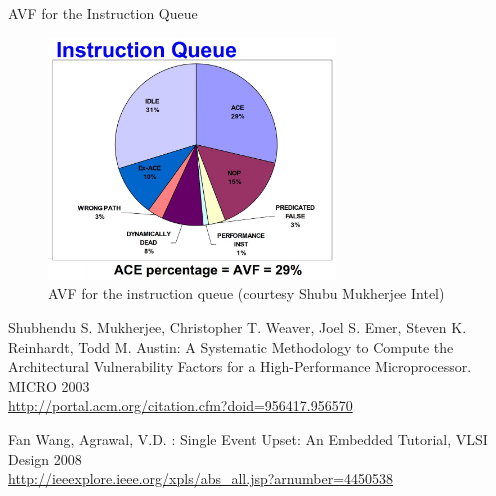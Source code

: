 \documentclass{beamer}
\begin{document}
\begin{frame}[shrink=10]{AVF for the Instruction Queue}
\begin{center}
\begin{figure}[h]
 \includegraphics[width=3in]{inst_queue}
\caption{\footnotesize AVF for the instruction queue (courtesy Shubu Mukherjee Intel)}
\end{figure}
\end{center}
\end{frame}


\footnotesize
\begin{thebibliography}{10}
Shubhendu S. Mukherjee, 
Christopher T. Weaver, Joel S. Emer, Steven K. Reinhardt, Todd M. Austin: A Systematic 
Methodology to Compute the Architectural Vulnerability Factors for a High-Performance Microprocessor. MICRO 2003 \\
\url{http://portal.acm.org/citation.cfm?doid=956417.956570}

Fan Wang, Agrawal, V.D. : Single Event Upset: An Embedded Tutorial, VLSI Design 2008 \\
\url{http://ieeexplore.ieee.org/xpls/abs_all.jsp?arnumber=4450538}

\end{thebibliography}
\end{document}
